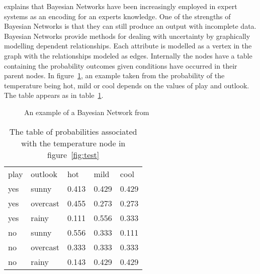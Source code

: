\cite{export:69588} explains that Bayesian Networks have been increasingly employed in expert systems as an encoding for an experts knowledge. One of the strengths of Bayesian Networks is that they can still produce an output with incomplete data. Bayesian Networks provide methods for dealing with uncertainty by graphically modelling dependent relationships. Each attribute is modelled as a vertex in the graph with the relationships modeled as edges. Internally the nodes have a table containing the probability outcomes given conditions have occurred in their parent nodes. In figure~\ref{fig:bayesnet}, an example taken from \cite{witten2005data} the probability of the temperature being hot, mild or cool depends on the values of play and outlook. The table appears as in table~\ref{tab:bayes_table}.

\begin{figure}[h]
\centering
{}
\caption{An example of a Bayesian Network from \cite{witten2005data}}
\label{fig:bayesnet}
\end{figure}

\begin{table}[h]
\centering
\begin{tabular}{|ll|lll|}
\hline
 play & outlook & hot & mild & cool \\ \cline{1-5} 
 yes & sunny & 0.413 & 0.429 & 0.429 \\ 
 yes & overcast & 0.455 & 0.273 & 0.273 \\ 
 yes & rainy & 0.111 & 0.556 & 0.333 \\ 
 no & sunny & 0.556 & 0.333 & 0.111 \\ 
 no & overcast & 0.333 & 0.333 & 0.333 \\ 
 no & rainy & 0.143 & 0.429 & 0.429 \\ 
\hline
\end{tabular}
\caption{The table of probabilities associated with the temperature node in figure~\ref{fig:test} }
\label{tab:bayes_table}
\end{table}

